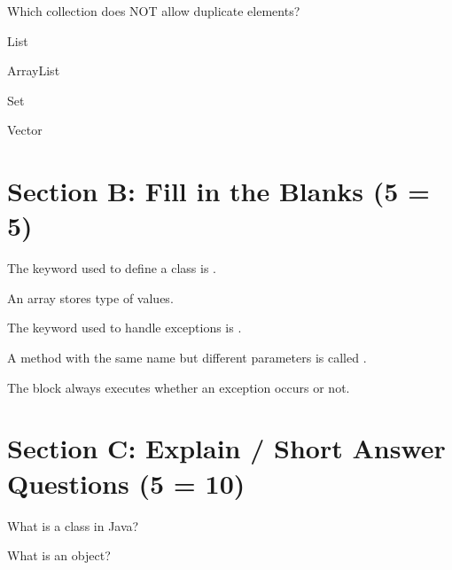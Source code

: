 \documentclass{USTBExam}
\begin{document}
\begin{question}
Which collection does NOT allow duplicate elements?
\paren
\begin{choices}
\item List
\item ArrayList
\item Set
\item Vector
\end{choices}
\end{question}



\section{Section B: Fill in the Blanks (5  = 5)}

\begin{question}
The keyword used to define a class is \fillin.
\end{question}

\begin{question}
An array stores \fillin type of values.
\end{question}

\begin{question}
The keyword used to handle exceptions is \fillin.
\end{question}

\begin{question}
A method with the same name but different parameters is called \fillin.
\end{question}

\begin{question}
The \fillin block always executes whether an exception occurs or not.
\end{question}



\section{Section C: Explain / Short Answer Questions (5  = 10)}

\begin{problem}
What is a class in Java?
\end{problem}

\begin{problem}
What is an object?
\end{problem}
\end{document}
